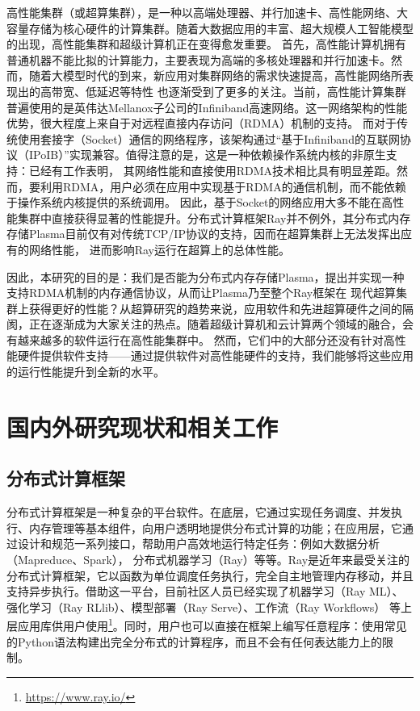 高性能集群（或超算集群），是一种以高端处理器、并行加速卡、高性能网络、大容量存储为核心硬件的计算集群。随着大数据应用的丰富、超大规模人工智能模型的出现，高性能集群和超级计算机正在变得愈发重要。
首先，高性能计算机拥有普通机器不能比拟的计算能力，主要表现为高端的多核处理器和并行加速卡。然而，随着大模型时代的到来，新应用对集群网络的需求快速提高，高性能网络所表现出的高带宽、低延迟等特性
也逐渐受到了更多的关注。当前，高性能计算集群普遍使用的是英伟达Mellanox子公司的Infiniband高速网络\cite{pfister2001introduction}。这一网络架构的性能优势，很大程度上来自于对远程直接内存访问（RDMA）机制的支持。
而对于传统使用套接字（Socket）通信的网络程序，该架构通过“基于Infiniband的互联网协议（IPoIB）”实现兼容。值得注意的是，这是一种依赖操作系统内核的非原生支持：已经有工作\cite{mitchell2013using}表明，
其网络性能和直接使用RDMA技术相比具有明显差距。然而，要利用RDMA，用户必须在应用中实现基于RDMA的通信机制，而不能依赖于操作系统内核提供的系统调用。
因此，基于Socket的网络应用大多不能在高性能集群中直接获得显著的性能提升。分布式计算框架Ray并不例外，其分布式内存存储Plasma目前仅有对传统TCP/IP协议的支持，因而在超算集群上无法发挥出应有的网络性能，
进而影响Ray运行在超算上的总体性能。

因此，本研究的目的是：我们是否能为分布式内存存储Plasma，提出并实现一种支持RDMA机制的内存通信协议，从而让Plasma乃至整个Ray框架在
现代超算集群上获得更好的性能？从超算研究的趋势来说，应用软件和先进超算硬件之间的隔阂，正在逐渐成为大家关注的热点。随着超级计算机和云计算两个领域的融合，会有越来越多的软件运行在高性能集群中。
然而，它们中的大部分还没有针对高性能硬件提供软件支持——通过提供软件对高性能硬件的支持，我们能够将这些应用的运行性能提升到全新的水平。

\section{国内外研究现状和相关工作}
\label{sec:related_work}

\subsection{分布式计算框架}

分布式计算框架是一种复杂的平台软件。在底层，它通过实现任务调度、并发执行、内存管理等基本组件，向用户透明地提供分布式计算的功能；在应用层，它通过设计和规范一系列接口，帮助用户高效地运行特定任务：例如大数据分析（Mapreduce、Spark），
分布式机器学习（Ray）等等。Ray是近年来最受关注的分布式计算框架，它以函数为单位调度任务执行，完全自主地管理内存移动，并且支持异步执行。借助这一平台，目前社区人员已经实现了机器学习（Ray ML）、强化学习（Ray RLlib）、模型部署（Ray Serve）、工作流（Ray Workflows）
等上层应用库供用户使用\footnote{\url{https://www.ray.io/}}。同时，用户也可以直接在框架上编写任意程序：使用常见的Python语法构建出完全分布式的计算程序，而且不会有任何表达能力上的限制。

